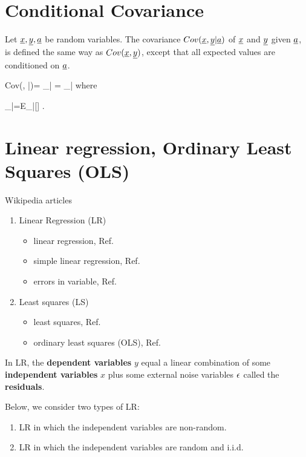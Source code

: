 \section{Conditional Covariance}
Let ${\underline{x}}, {\underline{y}}, {\underline{a}}$
be random variables.
The covariance $Cov({\underline{x}}, {\underline{y}}|{\underline{a}})$
of ${\underline{x}}$ and ${\underline{y}}$ 
given ${\underline{a}}$, is defined
the same
way as $Cov({\underline{x}}, {\underline{y}})$,
except that all
expected values are 
conditioned on ${\underline{a}}$. 



\beq
Cov(\rvx, \rvy|\rva)=
\av{\rvx, \rvy}_{|\rva}
=
\av{(\rvx-\av{\rvx}_{|\rva})
(\rvy-\av{\rvy}_{|\rva})}_{|\rva}
\eeq
where

\beq
\av{\rvx}_{|\rva}=E_{\rvx|\rva}[\rvx]
\;.
\eeq

\section{Linear regression, Ordinary Least Squares (OLS)}
Wikipedia articles
\begin{enumerate}
\item
Linear Regression (LR)
\begin{itemize}
\item
linear regression, Ref.\cite{wiki-lr}
\item
 simple linear regression, Ref.\cite{wiki-slr}
\item
errors in variable, Ref.\cite{wiki-errors-in-iv}

\end{itemize}
\item
Least squares (LS)
\begin{itemize}
\item
least squares, Ref.\cite{wiki-ls}
\item
ordinary least squares (OLS), Ref.\cite{wiki-ols}
\end{itemize}
\end{enumerate}


In LR, the {\bf dependent variables} 
$y$
equal
a linear combination of some
{\bf independent variables} $x$ 
 plus some external noise variables
$\epsilon$ called the {\bf residuals}.

Below, we consider two types of LR:

\begin{enumerate}
\item
LR
in which the independent
 variables are non-random.
\item
LR
in which the independent
 variables are random
and i.i.d.
\end{enumerate}

